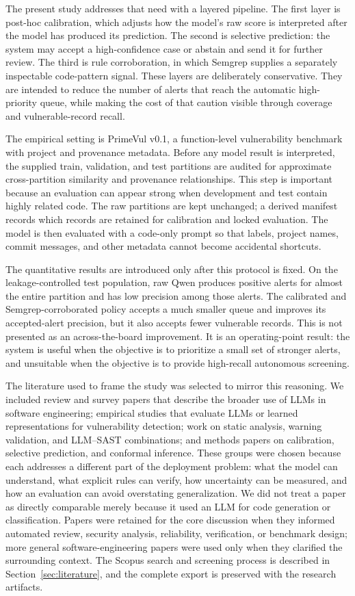 \documentclass[pdflatex,sn-mathphys-num]{sn-jnl}
\begin{document}
The present study addresses that need with a layered pipeline. The first layer is post-hoc calibration, which adjusts how the model's raw score is interpreted after the model has produced its prediction. The second is selective prediction: the system may accept a high-confidence case or abstain and send it for further review. The third is rule corroboration, in which Semgrep supplies a separately inspectable code-pattern signal. These layers are deliberately conservative. They are intended to reduce the number of alerts that reach the automatic high-priority queue, while making the cost of that caution visible through coverage and vulnerable-record recall.

The empirical setting is PrimeVul v0.1, a function-level vulnerability benchmark with project and provenance metadata. Before any model result is interpreted, the supplied train, validation, and test partitions are audited for approximate cross-partition similarity and provenance relationships. This step is important because an evaluation can appear strong when development and test contain highly related code. The raw partitions are kept unchanged; a derived manifest records which records are retained for calibration and locked evaluation. The model is then evaluated with a code-only prompt so that labels, project names, commit messages, and other metadata cannot become accidental shortcuts.

The quantitative results are introduced only after this protocol is fixed. On the leakage-controlled test population, raw Qwen produces positive alerts for almost the entire partition and has low precision among those alerts. The calibrated and Semgrep-corroborated policy accepts a much smaller queue and improves its accepted-alert precision, but it also accepts fewer vulnerable records. This is not presented as an across-the-board improvement. It is an operating-point result: the system is useful when the objective is to prioritize a small set of stronger alerts, and unsuitable when the objective is to provide high-recall autonomous screening.

The literature used to frame the study was selected to mirror this reasoning. We included review and survey papers that describe the broader use of LLMs in software engineering; empirical studies that evaluate LLMs or learned representations for vulnerability detection; work on static analysis, warning validation, and LLM--SAST combinations; and methods papers on calibration, selective prediction, and conformal inference. These groups were chosen because each addresses a different part of the deployment problem: what the model can understand, what explicit rules can verify, how uncertainty can be measured, and how an evaluation can avoid overstating generalization. We did not treat a paper as directly comparable merely because it used an LLM for code generation or classification. Papers were retained for the core discussion when they informed automated review, security analysis, reliability, verification, or benchmark design; more general software-engineering papers were used only when they clarified the surrounding context. The Scopus search and screening process is described in Section~\ref{sec:literature}, and the complete export is preserved with the research artifacts.
\end{document}
